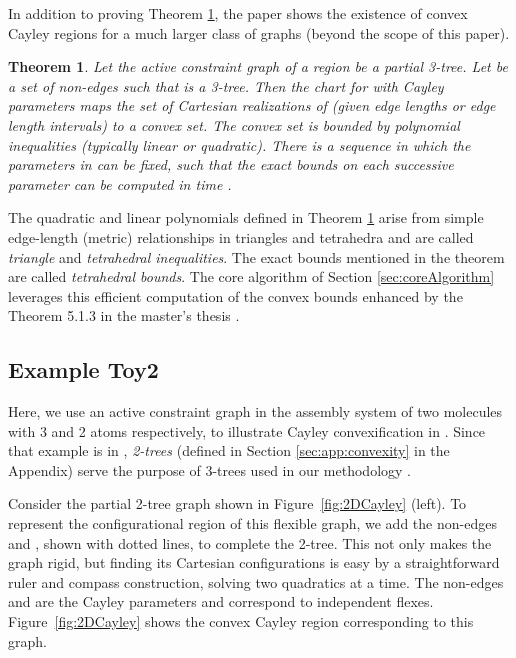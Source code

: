 \documentclass[]{article}
\newtheorem{theorem}{Theorem}[section]
\newcommand{\figref}[1]{Figure~\ref{#1}}
\newcommand{\toytwodtwo}{Toy2}
\begin{document}
In addition to proving Theorem \ref{thm:SiGa}, the paper \cite{SiGa:2010} shows
the existence of convex Cayley regions for a much larger class of
graphs (beyond the scope of this paper).

\begin{theorem}\label{thm:SiGa} 
Let the active constraint graph   of a region  be a partial
3-tree. Let  be a set of non-edges such that  is a 3-tree.
Then the chart for  with Cayley parameters  
maps the set of Cartesian realizations of  (given edge lengths or edge length intervals) to a convex set.
The convex set is bounded by  polynomial inequalities (typically linear or quadratic). 
There is a sequence in which the parameters in  can be fixed, such that the exact bounds on each successive parameter can
be computed in time .
\end{theorem}

The quadratic and linear polynomials defined in Theorem \ref{thm:SiGa} arise from
simple edge-length (metric) relationships in triangles and tetrahedra
and are called \emph{triangle} and \emph{tetrahedral inequalities}. The exact bounds
mentioned in the theorem are called \emph{tetrahedral bounds}. The core algorithm 
of Section \ref{sec:coreAlgorithm} leverages
this efficient computation of the convex bounds enhanced by the Theorem 5.1.3
in the master's thesis \cite{ugandhar}. 

\subsection{Example \toytwodtwo}
\label{sec:app:toytwodC}
Here, we use an active constraint graph in the assembly system of two molecules
with 3 and 2 atoms respectively, to illustrate Cayley convexification in
. Since that example is in , \emph{2-trees}
(defined in Section \ref{sec:app:convexity} in the Appendix) serve the purpose
of 3-trees used in our methodology \cite{SiGa:2010}.

Consider the partial 2-tree graph shown in \figref{fig:2DCayley} (left). To
represent the configurational region of this flexible graph, we add the
non-edges  and , shown with dotted lines, to complete the 2-tree. This
not only makes the graph rigid, but finding its Cartesian configurations is easy by a
straightforward ruler and compass construction, solving two quadratics at a
time. The non-edges  and  are the Cayley parameters and correspond to
independent flexes. \figref{fig:2DCayley} shows the convex Cayley
region corresponding to this graph. 
\end{document}
